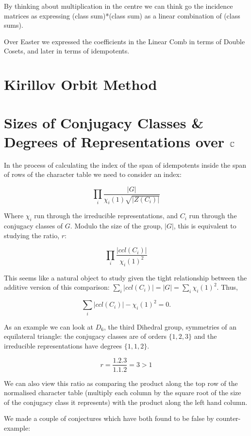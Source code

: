 By thinking about multiplication in the centre we can think go the incidence matrices as expressing (class sum)*(class sum) as a linear combination of (class sums).

Over Easter we expressed the coefficients in the Linear Comb in terms of Double Cosets, and later in terms of idempotents.


\section{Kirillov Orbit Method}

\section{Sizes of Conjugacy Classes \& Degrees of Representations over $\mathbb C$}

In the process of calculating the index of the span of idempotents inside the span 
of rows of the character table we need to consider an index:

$$\prod_i \frac{|G|}{\chi_i (1) \sqrt{|Z(C_i)|}}$$

Where $\chi_i$ run through the irreducible representations, and $C_i$ run through the conjugacy classes of $G$. Modulo the size of the group, $|G|$, this is equivalent to studying the ratio, $r$:

$$\prod_i \frac{|ccl(C_i)|}{\chi_i (1)^2}$$

This seems like a natural object to study given the tight relationship between the additive version of this comparison: $\sum_i |ccl(C_i)| = |G| = \sum_i \chi_i (1)^2$. Thus,

$$\sum_i |ccl(C_i)| - \chi_i (1)^2 = 0.$$

As an example we can look at $D_6$, the third Dihedral group, symmetries of an equilateral triangle: the conjugacy classes are of orders $\{1,2,3\}$ and the irreducible representations have degrees $\{1,1,2\}$.

$$r= \frac{1.2.3}{1.1.2} = 3 >1$$

We can also view this ratio as comparing the product along the top row of the normalised character table (multiply each column by the square root of the size of the conjugacy class it represents)  with the product along the left hand column.

We made a couple of conjectures which have both found to be false by counter-example:

